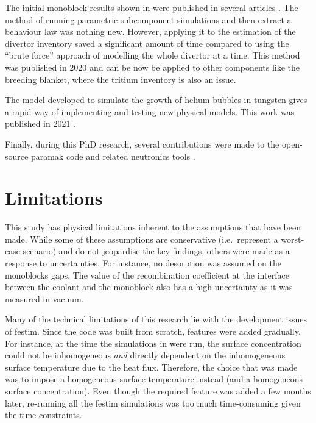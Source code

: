 The initial monoblock results shown in  were published in several articles \cite{delaporte-mathurin_finite_2019, delaporte-mathurin_parametric_2021, delaporte-mathurin_influence_2021-1}.
The method of running parametric subcomponent simulations and then extract a behaviour law was nothing new.
However, applying it to the estimation of the \gls{divertor} inventory saved a significant amount of time compared to using the ``brute force'' approach of modelling the whole \gls{divertor} at a time.
This method was published in 2020 \cite{delaporte-mathurin_parametric_2020} and can be now be applied to other components like the \gls{breeding blanket}, where the tritium inventory is also an issue.

The model developed to simulate the growth of helium bubbles in tungsten gives a rapid way of implementing and testing new physical models.
This work was published in 2021 \cite{delaporte-mathurin_influence_2021}.

Finally, during this PhD research, several contributions were made to the open-source \gls{paramak} code and related neutronics tools \cite{shimwell_paramak_2021}.

\section*{Limitations}

This study has physical limitations inherent to the assumptions that have been made.
While some of these assumptions are conservative (i.e.\ represent a worst-case scenario) and do not jeopardise the key findings, others were made as a response to uncertainties.
For instance, no desorption was assumed on the monoblocks gaps.
The value of the recombination coefficient at the interface between the coolant and the monoblock also has a high uncertainty as it was measured in vacuum.

Many of the technical limitations of this research lie with the development issues of \gls{festim}.
Since the code was built from scratch, features were added gradually.
For instance, at the time the simulations in  were run, the surface concentration could not be inhomogeneous \emph{and} directly dependent on the inhomogeneous surface temperature due to the heat flux.
Therefore, the choice that was made was to impose a homogeneous surface temperature instead (and a homogeneous surface concentration).
Even though the required feature was added a few months later, re-running all the \gls{festim} simulations was too much time-consuming given the time constraints.



